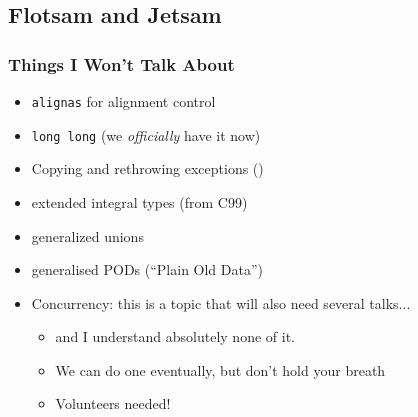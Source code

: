 \subsection{Flotsam and Jetsam}
\begin{frame}[fragile,t]
\frametitle{Things I Won't Talk About}
\begin{itemize}[<+->]
\item \texttt{alignas} for alignment control
\item \texttt{long long} (we \emph{officially} have it now)
\item Copying and rethrowing exceptions ()
\item extended integral types (from C99)
\item generalized unions
\item generalised PODs (``Plain Old Data'')
\vskip 12pt
\item Concurrency: this is a topic that will also need several
  talks...
\begin{itemize}
  \item and I understand absolutely none of it.
  \item We can do one eventually, but don't hold your breath
  \item Volunteers needed!
\end{itemize}
\end{itemize}
\end{frame}
